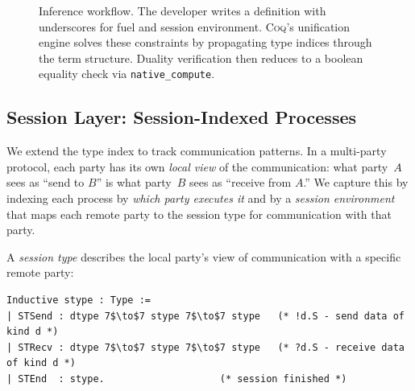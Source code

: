 \documentclass[11pt]{article}
\newcommand{\coqin}[1]{\texttt{#1}}
\newcommand{\coq}{\textsc{Coq}}
\begin{document}
\begin{figure}[htbp]
  \caption{Inference workflow. The developer writes a definition with
    underscores for fuel and session environment. \coq{}'s unification
    engine solves these constraints by propagating type indices through
    the term structure. Duality verification then reduces to a boolean
    equality check via \coqin{native\_compute}.}
  \label{fig:unification-flow}
\end{figure}

\subsection{Session Layer: Session-Indexed Processes}

We extend the type index to track communication patterns. In a multi-party
protocol, each party has its own \emph{local view} of the communication:
what party~$A$ sees as ``send to $B$'' is what party~$B$ sees as ``receive
from $A$.'' We capture this by indexing each process by \emph{which party
executes it} and by a \emph{session environment} that maps
each remote party to the session type for communication with that party.

A \emph{session type} describes the local party's view of communication
with a specific remote party:

\begin{verbatim}
Inductive stype : Type :=
| STSend : dtype 7$\to$7 stype 7$\to$7 stype   (* !d.S - send data of kind d *)
| STRecv : dtype 7$\to$7 stype 7$\to$7 stype   (* ?d.S - receive data of kind d *)
| STEnd  : stype.                    (* session finished *)
\end{verbatim}
\end{document}

